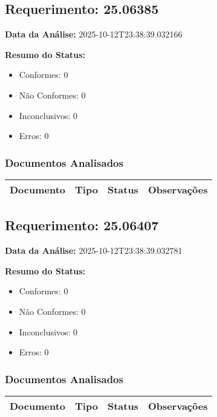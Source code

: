 \documentclass[12pt,a4paper]{article}
\begin{document}
\subsection{Requerimento: 25.06385}

\textbf{Data da Análise:} 2025-10-12T23:38:39.032166

\textbf{Resumo do Status:}
\begin{itemize}
    \item Conformes: 0
    \item Não Conformes: 0
    \item Inconclusivos: 0
    \item Erros: 0
\end{itemize}

\subsubsection{Documentos Analisados}

\begin{longtable}{|p{4cm}|p{2cm}|p{2cm}|p{6cm}|}
\hline
\textbf{Documento} & \textbf{Tipo} & \textbf{Status} & \textbf{Observações} \\
\hline
\endhead
\end{longtable}


\subsection{Requerimento: 25.06407}

\textbf{Data da Análise:} 2025-10-12T23:38:39.032781

\textbf{Resumo do Status:}
\begin{itemize}
    \item Conformes: 0
    \item Não Conformes: 0
    \item Inconclusivos: 0
    \item Erros: 0
\end{itemize}

\subsubsection{Documentos Analisados}

\begin{longtable}{|p{4cm}|p{2cm}|p{2cm}|p{6cm}|}
\hline
\textbf{Documento} & \textbf{Tipo} & \textbf{Status} & \textbf{Observações} \\
\hline
\endhead
\end{longtable}
\end{document}
